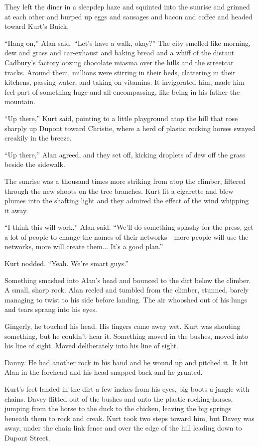 They left the diner in a sleepdep haze and squinted into the sunrise
and grinned at each other and burped up eggs and sausages and bacon
and coffee and headed toward Kurt's Buick.

``Hang on,'' Alan said.  ``Let's have a walk, okay?'' The city smelled
like morning, dew and grass and car-exhaust and baking bread and a
whiff of the distant Cadbury's factory oozing chocolate miasma over
the hills and the streetcar tracks.  Around them, millions were
stirring in their beds, clattering in their kitchens, passing water,
and taking on vitamins.  It invigorated him, made him feel part of
something huge and all-encompassing, like being in his father the
mountain.

``Up there,'' Kurt said, pointing to a little playground atop the hill
that rose sharply up Dupont toward Christie, where a herd of plastic
rocking horses swayed creakily in the breeze.

``Up there,'' Alan agreed, and they set off, kicking droplets of dew
off the grass beside the sidewalk.

The sunrise was a thousand times more striking from atop the climber,
filtered through the new shoots on the tree branches.  Kurt lit a
cigarette and blew plumes into the shafting light and they admired the
effect of the wind whipping it away.

``I think this will work,'' Alan said.  ``We'll do something splashy
for the press, get a lot of people to change the names of their
networks---more people will use the networks, more will create them... 
It's a good plan.''

Kurt nodded.  ``Yeah.  We're smart guys.''

Something smashed into Alan's head and bounced to the dirt below the
climber.  A small, sharp rock.  Alan reeled and tumbled from the
climber, stunned, barely managing to twist to his side before landing. 
The air whooshed out of his lungs and tears sprang into his eyes.

Gingerly, he touched his head.  His fingers came away wet.  Kurt was
shouting something, but he couldn't hear it.  Something moved in the
bushes, moved into his line of sight.  Moved deliberately into his
line of sight.

Danny.  He had another rock in his hand and he wound up and pitched
it.  It hit Alan in the forehead and his head snapped back and he
grunted.

Kurt's feet landed in the dirt a few inches from his eyes, big boots
a-jangle with chains.  Davey flitted out of the bushes and onto the
plastic rocking-horses, jumping from the horse to the duck to the
chicken, leaving the big springs beneath them to rock and creak.  Kurt
took two steps toward him, but Davey was away, under the chain link
fence and over the edge of the hill leading down to Dupont Street.

